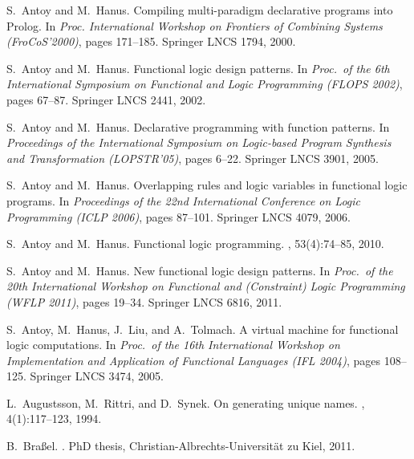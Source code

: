 \documentclass{llncs}
\begin{document}
\begin{thebibliography}{10}

S.~Antoy and M.~Hanus.
\newblock Compiling multi-paradigm declarative programs into {Prolog}.
\newblock In {\em Proc. International Workshop on Frontiers of Combining
  Systems (FroCoS'2000)}, pages 171--185. Springer LNCS 1794, 2000.

S.~Antoy and M.~Hanus.
\newblock Functional logic design patterns.
\newblock In {\em Proc.\ of the 6th International Symposium on Functional and
  Logic Programming (FLOPS 2002)}, pages 67--87. Springer LNCS 2441, 2002.

S.~Antoy and M.~Hanus.
\newblock Declarative programming with function patterns.
\newblock In {\em Proceedings of the International Symposium on Logic-based
  Program Synthesis and Transformation (LOPSTR'05)}, pages 6--22. Springer LNCS
  3901, 2005.

S.~Antoy and M.~Hanus.
\newblock Overlapping rules and logic variables in functional logic programs.
\newblock In {\em Proceedings of the 22nd International Conference on Logic
  Programming (ICLP 2006)}, pages 87--101. Springer LNCS 4079, 2006.

S.~Antoy and M.~Hanus.
\newblock Functional logic programming.
, 53(4):74--85, 2010.

S.~Antoy and M.~Hanus.
\newblock New functional logic design patterns.
\newblock In {\em Proc.\ of the 20th International Workshop on Functional and
  (Constraint) Logic Programming (WFLP 2011)}, pages 19--34. Springer LNCS
  6816, 2011.

S.~Antoy, M.~Hanus, J.~Liu, and A.~Tolmach.
\newblock A virtual machine for functional logic computations.
\newblock In {\em Proc.\ of the 16th International Workshop on Implementation
  and Application of Functional Languages (IFL 2004)}, pages 108--125. Springer
  LNCS 3474, 2005.

L.~Augustsson, M.~Rittri, and D.~Synek.
\newblock On generating unique names.
, 4(1):117--123, 1994.

B.~Bra{\ss}el.
.
\newblock PhD thesis, Christian-Albrechts-Universit{\"a}t zu Kiel, 2011.


\end{thebibliography}
\end{document}
